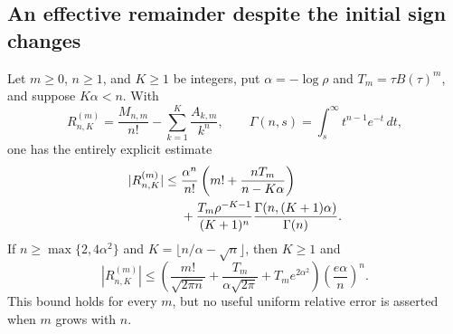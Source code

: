 \subsection{An effective remainder despite the initial sign changes}

\begin{theorem}\label{reflected:gam:thm:effective}
Let $m\ge0$, $n\ge1$, and $K\ge1$ be integers, put
$\alpha=-\log\rho$ and $T_m=\tau B(\tau)^m$, and suppose $K\alpha<n$.
With
\[
 R^{(m)}_{n,K}=\frac{M_{n,m}}{n!}
             -\sum_{k=1}^K\frac{A_{k,m}}{k^n},
 \qquad \Gamma(n,s)=\int_s^\infty t^{n-1}e^{-t}\,dt,
\]
one has the entirely explicit estimate
\begin{align}\label{reflected:gam:eq:effective}
 |R^{(m)}_{n,K}|\le{}&\frac{\alpha^n}{n!}
 \left(m!+\frac{nT_m}{n-K\alpha}\right)\notag\\
 &+\frac{T_m\rho^{-K-1}}{(K+1)^n}
          \frac{\Gamma(n,(K+1)\alpha)}{\Gamma(n)}.
\end{align}
If $n\ge\max\{2,4\alpha^2\}$ and
$K=\lfloor n/\alpha-\sqrt n\rfloor$, then $K\ge1$ and
\begin{equation}\label{reflected:gam:eq:optimized}
 |R^{(m)}_{n,K}|\le
 \left(\frac{m!}{\sqrt{2\pi n}}+
       \frac{T_m}{\alpha\sqrt{2\pi}}+T_m e^{2\alpha^2}\right)
 \left(\frac{e\alpha}{n}\right)^n.
\end{equation}
This bound holds for every $m$, but no useful uniform relative error is
asserted when $m$ grows with $n$.
\end{theorem}
